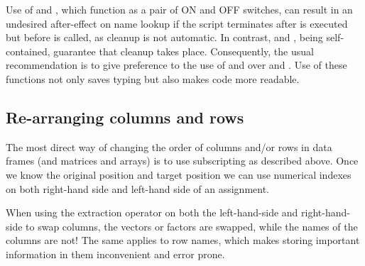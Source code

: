 \documentclass[krantz2]{krantz}\usepackage{knitr}
\begin{document}
\begin{explainbox}
Use of  and , which function as a pair of ON and OFF switches, can result in an undesired after-effect on name lookup if the script terminates after  is executed but before  is called, as cleanup is not automatic. In contrast,  and , being self-contained, guarantee that cleanup takes place. Consequently, the usual recommendation is to give preference to the use of  and  over  and . Use of these functions not only saves typing but also makes code more readable.
\end{explainbox}

\subsection{Re-arranging columns and rows}
The most direct way of changing the order of columns and/or rows in data frames (and matrices and arrays) is to use subscripting as described above. Once we know the original position and target position we can use numerical indexes on both right-hand side and left-hand side of an assignment.

\begin{warningbox}
When using the extraction operator \Roperator{[]} on both the left-hand-side and right-hand-side to swap columns, the vectors or factors are swapped, while the names of the columns are not! The same applies to row names, which makes storing important information in them inconvenient and error prone.
\end{warningbox}
\end{document}
